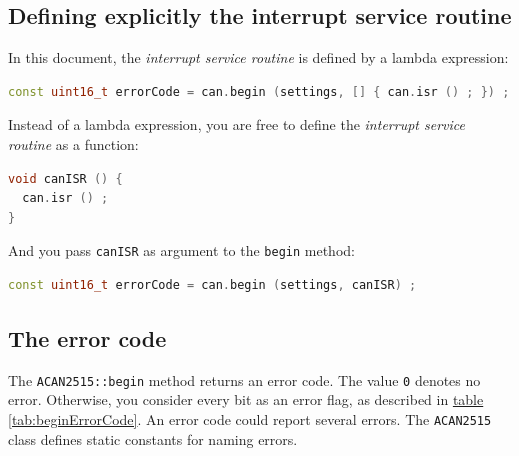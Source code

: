 \documentclass[10pt, a4paper, obeyspaces]{extarticle}
\newcommand \subsectionLabel[2]{\subsection{#1}\label{subsec:#2}}
\newcommand\refTableau[1]{\hyperref[tab:#1]{table \ref*{tab:#1}}}
\begin{document}
\subsectionLabel{Defining explicitly the interrupt service routine}{isrExplicit}

In this document, the \emph{interrupt service routine} is defined by a lambda expression:
{ \small\begin{lstlisting}[language=c++]
  const uint16_t errorCode = can.begin (settings, [] { can.isr () ; }) ;
\end{lstlisting}}

Instead of a lambda expression, you are free to define the \emph{interrupt service routine} as a function:
{ \small\begin{lstlisting}[language=c++]
void canISR () {
  can.isr () ;
}
\end{lstlisting}}

And you pass \texttt{canISR} as argument to the \texttt{begin} method:
{ \small\begin{lstlisting}[language=c++]
  const uint16_t errorCode = can.begin (settings, canISR) ;
\end{lstlisting}}


\subsectionLabel{The error code}{errorCodeMethodBegin}

The \texttt{ACAN2515::begin} method returns an error code. The value \texttt{0} denotes no error. Otherwise, you consider every bit as an error flag, as described in \refTableau{beginErrorCode}. An error code could report several errors. The \texttt{ACAN2515} class defines static constants for naming errors.
\end{document}
